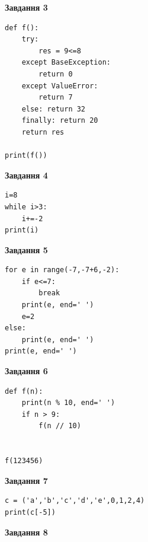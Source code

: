 \documentclass[12pt, ukrainian]{article}
\begin{document}
{{{{{{{\begin{minipage}[t]{7.5cm}
\begin{center}
\textbf{Завдання 3}
\end{center}

\begin{verbatim}
def f():
    try:
        res = 9<=8
    except BaseException: 
        return 0
    except ValueError: 
        return 7
    else: return 32
    finally: return 20
    return res

print(f())
\end{verbatim}



\begin{center}
\textbf{Завдання 4}
\end{center}

\begin{verbatim}
i=8
while i>3:
    i+=-2
print(i)
\end{verbatim}

\end{minipage}
\vline \hspace{6mm}
\begin{minipage}[t]{10.5cm}

\begin{center}
\textbf{Завдання 5}
\end{center}

\begin{verbatim}
for e in range(-7,-7+6,-2):
    if e<=7:
        break
    print(e, end=' ')
    e=2
else:
    print(e, end=' ')
print(e, end=' ')
\end{verbatim}



\begin{center}
\textbf{Завдання 6}
\end{center}

\begin{verbatim}
def f(n):
    print(n % 10, end=' ')
    if n > 9:
        f(n // 10)
    

f(123456)
\end{verbatim}



\begin{center}
\textbf{Завдання 7}
\end{center}

\begin{verbatim}
c = ('a','b','c','d','e',0,1,2,4)
print(c[-5])
\end{verbatim}



\begin{center}
\textbf{Завдання 8}
\end{center}


\end{minipage}}}}}}}}
\end{document}
